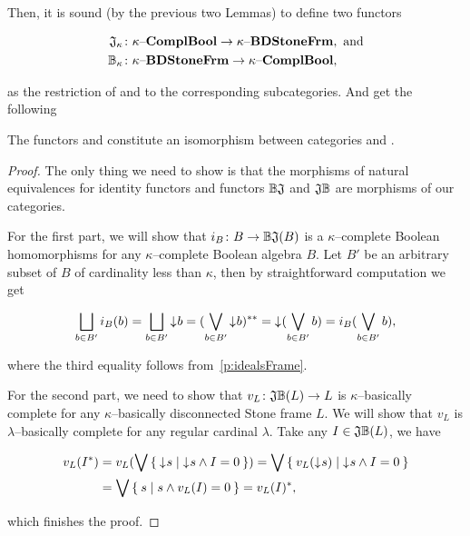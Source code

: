 Then, it is sound (by the previous two Lemmas) to define two functors

\begin{align*}
    \DEFSYM{JK}{\JK}&\colon \kComplBool \to \kBDStoneFrm, \text{ and} \\
    \DEFSYM{BcK}{\BcK}&\colon \kBDStoneFrm \to \kComplBool,
\end{align*}

\noindent as the restriction of \JO{} and \BcO{} to the corresponding subcategories. And get the following

\begin{theorem*}\label{p:kappaDuality}
    The functors \JK{} and \BcK{} constitute an isomorphism between categories \kComplBool{} and \kBDStoneFrm.
\end{theorem*}
\begin{proof}
    The only thing we need to show is that the morphisms of natural equivalences for identity functors and functors $\mathbb{B}\mathfrak{J}$ and $\mathfrak{J}\mathbb{B}$ are morphisms of our categories.

    For the first part, we will show that $i_B\colon B \to \mathbb{B}\mathfrak{J}(B)$ is a $\kappa$--complete Boolean homomorphisms for any $\kappa$--complete Boolean algebra $B$. Let $B'$ be an arbitrary subset of $B$ of cardinality less than $\kappa$, then by straightforward computation we get

    $$
        \bigsqcup_{b\in B'} i_B(b) = \bigsqcup_{b\in B'} \mathord{\downarrow}\mkern1mu b = (\bigvee_{b\in B'} \mathord{\downarrow}\mkern1mu b)^{**} = \mathord{\downarrow}\mkern1mu (\bigvee_{b\in B'} b) = i_B(\bigvee_{b\in B'} b),
    $$

    \noindent where the third equality follows from~\ref{p:idealsFrame}.

    For the second part, we need to show that $v_L\colon \mathfrak{J}\mathbb{B}(L) \to L$ is $\kappa$--basically complete for any $\kappa$--basically disconnected Stone frame $L$. We will show that $v_L$ is $\lambda$--basically complete for any regular cardinal $\lambda$. Take any $I \in \mathfrak{J}\mathbb{B}(L)$, we have

    \begin{align*}
        v_L(I^*) &= v_L(\bigvee \Set{ \mathord{\downarrow}\mkern1mus | \mathord{\downarrow}\mkern1mus \wedge I = 0 })
                  = \bigvee \Set{ v_L(\mathord{\downarrow}\mkern1mus) | \mathord{\downarrow}\mkern1mus \wedge I = 0 } \\
                 &= \bigvee \Set{ s | s \wedge v_L(I) = 0 } = v_L(I)^*,
    \end{align*}

    \noindent which finishes the proof.
\end{proof}

